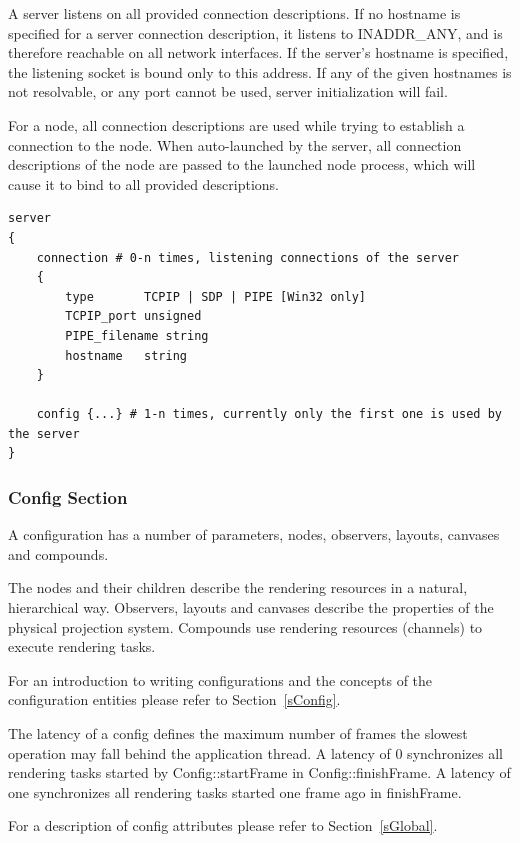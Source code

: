 \documentclass[10pt,a4]{scrartcl}
\newcommand{\sref}[1]{Section~\ref{#1}}
\begin{document}
A server listens on all provided connection descriptions. If no hostname
is specified for a server connection description, it listens to
INADDR\_ANY, and is therefore reachable on all network interfaces. If
the server's hostname is specified, the listening socket is bound only
to this address. If any of the given hostnames is not resolvable, or any
port cannot be used, server initialization will fail.

For a node, all connection descriptions are used while trying to
establish a connection to the node. When auto-launched by the server,
all connection descriptions of the node are passed to the launched node
process, which will cause it to bind to all provided descriptions.

{\footnotesize\begin{lstlisting}
server
{
    connection # 0-n times, listening connections of the server
    {
        type       TCPIP | SDP | PIPE [Win32 only]
        TCPIP_port unsigned
        PIPE_filename string
        hostname   string
    }

    config {...} # 1-n times, currently only the first one is used by the server
}
\end{lstlisting}}

\subsubsection{Config Section}

A configuration has a number of parameters, nodes, observers, layouts,
canvases and compounds.

The nodes and their children describe the rendering resources in a
natural, hierarchical way. Observers, layouts and canvases describe the
properties of the physical projection system. Compounds use rendering
resources (channels) to execute rendering tasks.

For an introduction to writing configurations and the concepts of the
configuration entities please refer to \sref{sConfig}.

The latency of a config defines the maximum number of frames the
slowest operation may fall behind the application thread. A latency of 0
synchronizes all rendering tasks started by \textsf{Config::startFrame}
in \textsf{Config::finishFrame}. A latency of one synchronizes all
rendering tasks started one frame ago in \textsf{finishFrame}.

For a description of config attributes please refer to \sref{sGlobal}.
\end{document}
